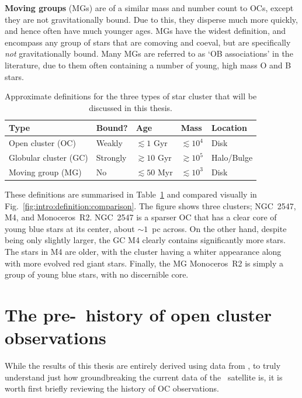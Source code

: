 \textbf{Moving groups} (MGs) are of a similar mass and number count to OCs, except they are not gravitationally bound. Due to this, they disperse much more quickly, and hence often have much younger ages. MGs have the widest definition, and encompass any group of stars that are comoving and coeval, but are specifically \emph{not} gravitationally bound. Many MGs are referred to as `OB associations' in the literature, due to them often containing a number of young, high mass O and B stars. 

\begin{table}[tb]
	\caption{Approximate definitions for the three types of star cluster that will be discussed in this thesis.\label{tab:intro:definition:definition}}
	\begin{tabularx}{\textwidth}{l | X | X | X | X}
		\hline\hline
		Type & Bound? & Age & Mass & Location \\
		\hline
		Open cluster (OC)   & Weakly & $\lesssim 1$ Gyr & $\lesssim 10^4$ \MSun & Disk \\
		Globular cluster (GC)   & Strongly & $\gtrsim 10$ Gyr & $\gtrsim 10^5$ \MSun & Halo/Bulge \\
		Moving group (MG)   & No & $\lesssim 50$ Myr & $\lesssim 10^3$ \MSun & Disk\\
		\hline
	\end{tabularx}
\end{table}

These definitions are summarised in Table~\ref{tab:intro:definition:definition} and compared visually in Fig.~\ref{fig:intro:definition:comparison}. The figure shows three clusters; NGC~2547, M4, and Monoceros~R2. NGC~2547 is a sparser OC that has a clear core of young blue stars at its center, about $\sim 1$~pc across. On the other hand, despite being only slightly larger, the GC M4 clearly contains significantly more stars. The stars in M4 are older, with the cluster having a whiter appearance along with more evolved red giant stars. Finally, the MG Monoceros~R2 is simply a group of young blue stars, with no discernible core. 





\section{The pre-\gaia\ history of open cluster observations}
\label{sec:intro:pre-gaia}

While the results of this thesis are entirely derived using data from \gaia, to truly understand just how groundbreaking the current data of the \gaia\ satellite is, it is worth first briefly reviewing the history of OC observations.


